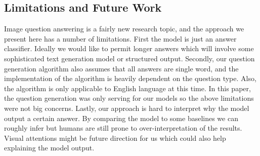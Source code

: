 \documentclass{article}
\renewcommand{\#}[1]{\textbf{#1}}
\begin{document}
\subsection{Limitations and Future Work}
Image question answering is a fairly new research topic, and the approach we present here has a number of limitations. First the model is just an answer classifier. Ideally we would like to permit longer answers which will involve some sophisticated text generation model or structured output. Secondly, our question generation algorithm also assumes that all answers are single word, and the implementation of the algorithm is heavily dependent on the question type. Also, the algorithm is only applicable to English language at this time. In this paper, the question generation was only serving for our models so the above limitations were not big concerns. Lastly, our approach is hard to interpret why the model output a certain answer. By comparing the model to some baselines we can roughly infer but humans are still prone to over-interpretation of the results. Visual attentions might be future direction for us which could also help explaining the model output.
\end{document}
